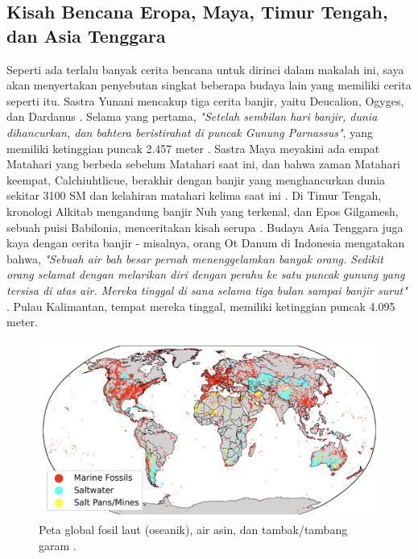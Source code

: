 \documentclass[10pt,twocolumn,letterpaper]{article}
\begin{document}
\subsection{Kisah Bencana Eropa, Maya, Timur Tengah, dan Asia Tenggara}


Seperti ada terlalu banyak cerita bencana untuk dirinci dalam makalah ini, saya akan menyertakan penyebutan singkat beberapa budaya lain yang memiliki cerita seperti itu. Sastra Yunani mencakup tiga cerita banjir, yaitu Deucalion, Ogyges, dan Dardanus \cite{9,10}. Selama yang pertama, \textit{"Setelah sembilan hari banjir, dunia dihancurkan, dan bahtera beristirahat di puncak Gunung Parnassus"}, yang memiliki ketinggian puncak 2.457 meter \cite{11}. Sastra Maya meyakini ada empat Matahari yang berbeda sebelum Matahari saat ini, dan bahwa zaman Matahari keempat, Calchiuhtlicue, berakhir dengan banjir yang menghancurkan dunia sekitar 3100 SM dan kelahiran matahari kelima saat ini \cite{12}. Di Timur Tengah, kronologi Alkitab mengandung banjir Nuh yang terkenal, dan Epos Gilgamesh, sebuah puisi Babilonia, menceritakan kisah serupa \cite{13}. Budaya Asia Tenggara juga kaya dengan cerita banjir - misalnya, orang Ot Danum di Indonesia mengatakan bahwa, \textit{"Sebuah air bah besar pernah menenggelamkan banyak orang. Sedikit orang selamat dengan melarikan diri dengan perahu ke satu puncak gunung yang tersisa di atas air. Mereka tinggal di sana selama tiga bulan sampai banjir surut"} \cite{3}. Pulau Kalimantan, tempat mereka tinggal, memiliki ketinggian puncak 4.095 meter.

\begin{figure}[t]
\begin{center}
\includegraphics[width=1\textwidth]{marine.jpg}
\end{center}
   \caption{Peta global fosil laut (oseanik), air asin, dan tambak/tambang garam \cite{15,16,86,87}.}
   \label{fig:2}
\end{figure}
\end{document}
